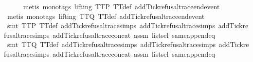 \begin{isabellebody}
\ \ \ \ \isamarkupfalse%
\ {\isacharparenleft}metis\ {\isacharparenleft}mono{\isacharunderscore}tags{\isacharcomma}\ lifting{\isacharparenright}\ TT{}{\isacharunderscore}P\ TT{}{\isacharunderscore}def\ add{\isacharunderscore}Tick{\isacharunderscore}refusal{\isacharunderscore}trace{\isacharunderscore}end{\isacharunderscore}event{\isacharparenright}\isanewline
\ \ \ \ \isamarkupfalse%
\ {\isacharparenleft}metis\ {\isacharparenleft}mono{\isacharunderscore}tags{\isacharcomma}\ lifting{\isacharparenright}\ TT{}{\isacharunderscore}Q\ TT{}{\isacharunderscore}def\ add{\isacharunderscore}Tick{\isacharunderscore}refusal{\isacharunderscore}trace{\isacharunderscore}end{\isacharunderscore}event{\isacharparenright}\isanewline
\ \ \ \ \isamarkupfalse%
\ {\isacharparenleft}smt\ TT{}{\isacharunderscore}P\ TT{}{\isacharunderscore}def\ add{\isacharunderscore}Tick{\isacharunderscore}refusal{\isacharunderscore}trace{\isachardot}simps{\isacharparenleft}{}{\isacharparenright}\ add{\isacharunderscore}Tick{\isacharunderscore}refusal{\isacharunderscore}trace{\isachardot}simps{\isacharparenleft}{}{\isacharparenright}\ add{\isacharunderscore}Tick{\isacharunderscore}refusal{\isacharunderscore}trace{\isachardot}simps{\isacharparenleft}{}{\isacharparenright}\ add{\isacharunderscore}Tick{\isacharunderscore}refusal{\isacharunderscore}trace{\isacharunderscore}concat\ assm{}\ list{\isachardot}sel{\isacharparenleft}{}{\isacharparenright}\ same{\isacharunderscore}append{\isacharunderscore}eq{\isacharparenright}\isanewline
\ \ \ \ \isamarkupfalse%
\ {\isacharparenleft}smt\ TT{}{\isacharunderscore}Q\ TT{}{\isacharunderscore}def\ add{\isacharunderscore}Tick{\isacharunderscore}refusal{\isacharunderscore}trace{\isachardot}simps{\isacharparenleft}{}{\isacharparenright}\ add{\isacharunderscore}Tick{\isacharunderscore}refusal{\isacharunderscore}trace{\isachardot}simps{\isacharparenleft}{}{\isacharparenright}\ add{\isacharunderscore}Tick{\isacharunderscore}refusal{\isacharunderscore}trace{\isachardot}simps{\isacharparenleft}{}{\isacharparenright}\ add{\isacharunderscore}Tick{\isacharunderscore}refusal{\isacharunderscore}trace{\isacharunderscore}concat\ assm{}\ list{\isachardot}sel{\isacharparenleft}{}{\isacharparenright}\ same{\isacharunderscore}append{\isacharunderscore}eq{\isacharparenright}\isanewline
\ \ \ \ \isamarkupfalse%

\end{isabellebody}
